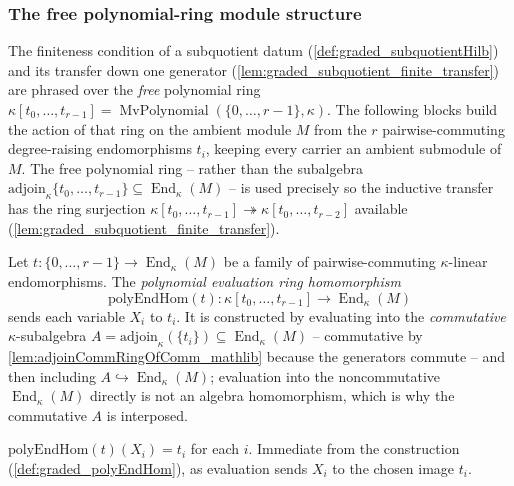 \subsubsection*{The free polynomial-ring module structure}

The finiteness condition of a subquotient datum (\cref{def:graded_subquotientHilb}) and
its transfer down one generator (\cref{lem:graded_subquotient_finite_transfer}) are
phrased over the \emph{free} polynomial ring \(\kappa[t_0, \dots, t_{r-1}] =
\operatorname{MvPolynomial}(\{0, \dots, r-1\}, \kappa)\). The following blocks build the
action of that ring on the ambient module \(M\) from the \(r\) pairwise-commuting
degree-raising endomorphisms \(t_i\), keeping every carrier an ambient submodule of
\(M\). The free polynomial ring -- rather than the subalgebra
\(\mathrm{adjoin}_\kappa\{t_0, \dots, t_{r-1}\} \subseteq \operatorname{End}_\kappa(M)\)
-- is used precisely so the inductive transfer has the ring surjection
\(\kappa[t_0, \dots, t_{r-1}] \twoheadrightarrow \kappa[t_0, \dots, t_{r-2}]\) available
(\cref{lem:graded_subquotient_finite_transfer}).

\begin{definition}\leanok
  \label{def:graded_polyEndHom}
  Let \(t : \{0, \dots, r-1\} \to \operatorname{End}_\kappa(M)\) be a family of
  pairwise-commuting \(\kappa\)-linear endomorphisms. The \emph{polynomial evaluation
  ring homomorphism}
  \[
    \mathrm{polyEndHom}(t) : \kappa[t_0, \dots, t_{r-1}] \longrightarrow
      \operatorname{End}_\kappa(M)
  \]
  sends each variable \(X_i\) to \(t_i\). It is constructed by evaluating into the
  \emph{commutative} \(\kappa\)-subalgebra \(A = \mathrm{adjoin}_\kappa(\{t_i\})
  \subseteq \operatorname{End}_\kappa(M)\) -- commutative by
  \cref{lem:adjoinCommRingOfComm_mathlib} because the generators commute -- and then
  including \(A \hookrightarrow \operatorname{End}_\kappa(M)\); evaluation into the
  noncommutative \(\operatorname{End}_\kappa(M)\) directly is not an algebra
  homomorphism, which is why the commutative \(A\) is interposed.
\end{definition}

\begin{lemma}\leanok
  \label{lem:graded_polyEndHom_X}
  \(\mathrm{polyEndHom}(t)(X_i) = t_i\) for each \(i\). Immediate from the construction
  (\cref{def:graded_polyEndHom}), as evaluation sends \(X_i\) to the chosen image
  \(t_i\).
\end{lemma}

